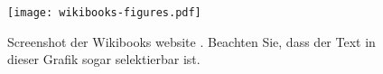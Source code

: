 \begin{figure}[ht] %
    \centering
    \texttt{[image: wikibooks-figures.pdf]}
    \caption[Wikibooks]{Screenshot der Wikibooks website \cite{figures}. Beachten
        Sie, dass der Text in dieser Grafik sogar selektierbar ist.}
    \label{fig:wikibooks}
\end{figure}